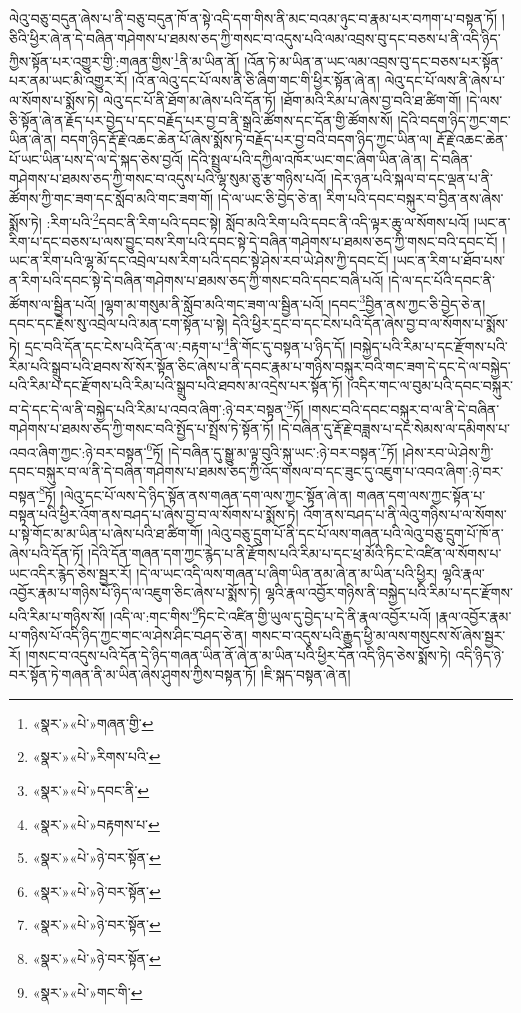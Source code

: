 ལེའུ་བཅུ་བདུན་ཞེས་པ་ནི་བཅུ་བདུན་ཁོ་ན་སྟེ་འདི་དག་གིས་ནི་མང་བའམ་ཉུང་བ་རྣམ་པར་བཀག་པ་བསྟན་ཏོ། །ཅིའི་ཕྱིར་ཞེ་ན་དེ་བཞིན་གཤེགས་པ་ཐམས་ཅད་ཀྱི་གསང་བ་འདུས་པའི་ལམ་འབྲས་བུ་དང་བཅས་པ་ནི་འདི་ཉིད་ཀྱིས་སྟོན་པར་འགྱུར་གྱི་:གཞན་གྱིས་\footnote{«སྣར་»«པེ་»གཞན་གྱི་}ནི་མ་ཡིན་ནོ། །འོན་ཏེ་མ་ཡིན་ན་ཡང་ལམ་འབྲས་བུ་དང་བཅས་པར་སྟོན་པར་ནམ་ཡང་མི་འགྱུར་རོ། །འོ་ན་ལེའུ་དང་པོ་ལས་ནི་ཅི་ཞིག་གང་གི་ཕྱིར་སྟོན་ཞེ་ན། ལེའུ་དང་པོ་ལས་ནི་ཞེས་པ་ལ་སོགས་པ་སྨོས་ཏེ། ལེའུ་དང་པོ་ནི་ཐོག་མ་ཞེས་པའི་དོན་ཏོ། །ཐོག་མའི་རིམ་པ་ཞེས་བྱ་བའི་ཐ་ཚིག་གོ། །དེ་ལས་ཅི་སྟོན་ཞེ་ན་རྗོད་པར་བྱེད་པ་དང་བརྗོད་པར་བྱ་བ་ནི་སྒྲའི་ཚོགས་དང་དོན་གྱི་ཚོགས་སོ། །དེའི་བདག་ཉིད་ཀྱང་གང་ཡིན་ཞེ་ན། བདག་ཉིད་རྡོ་རྗེ་འཆང་ཆེན་པོ་ཞེས་སྨོས་ཏེ་བརྗོད་པར་བྱ་བའི་བདག་ཉིད་ཀྱང་ཡིན་ལ། རྡོ་རྗེ་འཆང་ཆེན་པོ་ཡང་ཡིན་པས་དེ་ལ་དེ་སྐད་ཅེས་བྱའོ། །དེའི་སྤྲུལ་པའི་དཀྱིལ་འཁོར་ཡང་གང་ཞིག་ཡིན་ཞེ་ན། དེ་བཞིན་གཤེགས་པ་ཐམས་ཅད་ཀྱི་གསང་བ་འདུས་པའི་ལྷ་སུམ་ཅུ་རྩ་གཉིས་པའོ། །དེར་ཉན་པའི་སྐལ་བ་དང་ལྡན་པ་ནི་ཚོགས་ཀྱི་གང་ཟག་དང་སློབ་མའི་གང་ཟག་གོ། །དེ་ལ་ཡང་ཅི་བྱེད་ཅེ་ན། རིག་པའི་དབང་བསྐུར་བ་བྱིན་ནས་ཞེས་སྨོས་ཏེ། :རིག་པའི་\footnote{«སྣར་»«པེ་»རིགས་པའི་}དབང་ནི་རིག་པའི་དབང་སྟེ། སློབ་མའི་རིག་པའི་དབང་ནི་འདི་ལྟར་ཆུ་ལ་སོགས་པའོ། །ཡང་ན་རིག་པ་དང་བཅས་པ་ལས་བྱུང་བས་རིག་པའི་དབང་སྟེ་དེ་བཞིན་གཤེགས་པ་ཐམས་ཅད་ཀྱི་གསང་བའི་དབང་ངོ། །ཡང་ན་རིག་པའི་ལྷ་མོ་དང་འབྲེལ་པས་རིག་པའི་དབང་སྟེ་ཤེས་རབ་ཡེ་ཤེས་ཀྱི་དབང་ངོ། །ཡང་ན་རིག་པ་ཐོབ་པས་ན་རིག་པའི་དབང་སྟེ་དེ་བཞིན་གཤེགས་པ་ཐམས་ཅད་ཀྱི་གསང་བའི་དབང་བཞི་པའོ། །དེ་ལ་དང་པོའི་དབང་ནི་ཚོགས་ལ་སྦྱིན་པའོ། །ལྷག་མ་གསུམ་ནི་སློབ་མའི་གང་ཟག་ལ་སྦྱིན་པའོ། །དབང་\footnote{«སྣར་»«པེ་»དབང་ནི་}བྱིན་ནས་ཀྱང་ཅི་བྱེད་ཅེ་ན། དབང་དང་རྗེས་སུ་འབྲེལ་པའི་མན་ངག་སྟོན་པ་སྟེ། དེའི་ཕྱིར་དྲང་བ་དང་ངེས་པའི་དོན་ཞེས་བྱ་བ་ལ་སོགས་པ་སྨོས་ཏེ། དྲང་བའི་དོན་དང་ངེས་པའི་དོན་ལ་:བརྟག་པ་\footnote{«སྣར་»«པེ་»བརྟགས་པ་}ནི་གོང་དུ་བསྟན་པ་ཉིད་དོ། །བསྐྱེད་པའི་རིམ་པ་དང་རྫོགས་པའི་རིམ་པའི་སྒྲུབ་པའི་ཐབས་སོ་སོར་སྟོན་ཅིང་ཞེས་པ་ནི་དབང་རྣམ་པ་གཉིས་བསྐུར་བའི་གང་ཟག་དེ་དང་དེ་ལ་བསྐྱེད་པའི་རིམ་པ་དང་རྫོགས་པའི་རིམ་པའི་སྒྲུབ་པའི་ཐབས་མ་འདྲེས་པར་སྟོན་ཏོ། །འདིར་གང་ལ་བུམ་པའི་དབང་བསྐུར་བ་དེ་དང་དེ་ལ་ནི་བསྐྱེད་པའི་རིམ་པ་འབའ་ཞིག་:ཉེ་བར་བསྟན་\footnote{«སྣར་»«པེ་»ཉེ་བར་སྟོན་}ཏོ། །གསང་བའི་དབང་བསྐུར་བ་ལ་ནི་དེ་བཞིན་གཤེགས་པ་ཐམས་ཅད་ཀྱི་གསང་བའི་སྤྱོད་པ་སྤྲོས་ཏེ་སྟོན་ཏོ། །དེ་བཞིན་དུ་རྡོ་རྗེ་བཟླས་པ་དང་སེམས་ལ་དམིགས་པ་འབའ་ཞིག་ཀྱང་:ཉེ་བར་བསྟན་\footnote{«སྣར་»«པེ་»ཉེ་བར་སྟོན་}ཏོ། །དེ་བཞིན་དུ་སྒྱུ་མ་ལྟ་བུའི་སྐུ་ཡང་:ཉེ་བར་བསྟན་\footnote{«སྣར་»«པེ་»ཉེ་བར་སྟོན་}ཏོ། །ཤེས་རབ་ཡེ་ཤེས་ཀྱི་དབང་བསྐུར་བ་ལ་ནི་དེ་བཞིན་གཤེགས་པ་ཐམས་ཅད་ཀྱི་འོད་གསལ་བ་དང་ཟུང་དུ་འཇུག་པ་འབའ་ཞིག་:ཉེ་བར་བསྟན་\footnote{«སྣར་»«པེ་»ཉེ་བར་སྟོན་}ཏོ། །ལེའུ་དང་པོ་ལས་དེ་ཉིད་སྟོན་ནས་གཞན་དག་ལས་ཀྱང་སྟོན་ཞེ་ན། གཞན་དག་ལས་ཀྱང་སྟོན་པ་བསྟན་པའི་ཕྱིར་འོག་ནས་བཤད་པ་ཞེས་བྱ་བ་ལ་སོགས་པ་སྨོས་ཏེ། འོག་ནས་བཤད་པ་ནི་ལེའུ་གཉིས་པ་ལ་སོགས་པ་སྟེ་གོང་མ་མ་ཡིན་པ་ཞེས་པའི་ཐ་ཚིག་གོ། །ལེའུ་བཅུ་དྲུག་པོ་ནི་དང་པོ་ལས་གཞན་པའི་ལེའུ་བཅུ་དྲུག་པོ་ཁོ་ན་ཞེས་པའི་དོན་ཏོ། །དེའི་དོན་གཞན་དག་ཀྱང་རྙེད་པ་ནི་རྫོགས་པའི་རིམ་པ་དང་ཕྲ་མོའི་ཏིང་ངེ་འཛིན་ལ་སོགས་པ་ཡང་འདིར་རྙེད་ཅེས་སྦྱར་རོ། །དེ་ལ་ཡང་འདི་ལས་གཞན་པ་ཞིག་ཡིན་ནམ་ཞེ་ན་མ་ཡིན་པའི་ཕྱིར། ལྷའི་རྣལ་འབྱོར་རྣམ་པ་གཉིས་པོ་ཉིད་ལ་འཇུག་ཅིང་ཞེས་པ་སྨོས་ཏེ། ལྷའི་རྣལ་འབྱོར་གཉིས་ནི་བསྐྱེད་པའི་རིམ་པ་དང་རྫོགས་པའི་རིམ་པ་གཉིས་སོ། །འདི་ལ་:གང་གིས་\footnote{«སྣར་»«པེ་»གང་གི་}ཏིང་ངེ་འཛིན་གྱི་ཡུལ་དུ་བྱེད་པ་དེ་ནི་རྣལ་འབྱོར་པའོ། །རྣལ་འབྱོར་རྣམ་པ་གཉིས་པོ་འདི་ཉིད་ཀྱང་གང་ལ་ཤེས་ཤིང་བཤད་ཅེ་ན། གསང་བ་འདུས་པའི་རྒྱུད་ཕྱི་མ་ལས་གསུངས་སོ་ཞེས་སྦྱར་རོ། །གསང་བ་འདུས་པའི་དོན་དེ་ཉིད་གཞན་ཡིན་ནོ་ཞེ་ན་མ་ཡིན་པའི་ཕྱིར་དོན་འདི་ཉིད་ཅེས་སྨོས་ཏེ། འདི་ཉིད་ཉེ་བར་སྟོན་ཏེ་གཞན་ནི་མ་ཡིན་ཞེས་ཤུགས་ཀྱིས་བསྟན་ཏོ། །ཇི་སྐད་བསྟན་ཞེ་ན། 